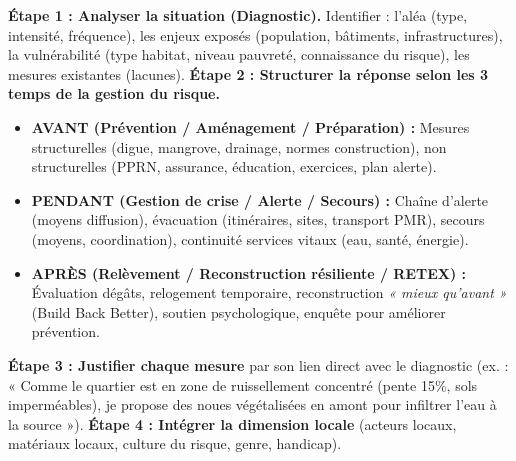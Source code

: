 \documentclass[11pt]{article}
\begin{document}
\begin{methode}
\textbf{Étape 1 : Analyser la situation (Diagnostic).} Identifier : l'aléa (type, intensité, fréquence), les enjeux exposés (population, bâtiments, infrastructures), la vulnérabilité (type habitat, niveau pauvreté, connaissance du risque), les mesures existantes (lacunes).
\textbf{Étape 2 : Structurer la réponse selon les 3 temps de la gestion du risque.}
\begin{itemize}
    \item \textbf{AVANT (Prévention / Aménagement / Préparation) :} Mesures structurelles (digue, mangrove, drainage, normes construction), non structurelles (PPRN, assurance, éducation, exercices, plan alerte).
    \item \textbf{PENDANT (Gestion de crise / Alerte / Secours) :} Chaîne d'alerte (moyens diffusion), évacuation (itinéraires, sites, transport PMR), secours (moyens, coordination), continuité services vitaux (eau, santé, énergie).
    \item \textbf{APRÈS (Relèvement / Reconstruction résiliente / RETEX) :} Évaluation dégâts, relogement temporaire, reconstruction \emph{« mieux qu'avant »} (Build Back Better), soutien psychologique, enquête pour améliorer prévention.
\end{itemize}
\textbf{Étape 3 : Justifier chaque mesure} par son lien direct avec le diagnostic (ex. : « Comme le quartier est en zone de ruissellement concentré (pente 15\%, sols imperméables), je propose des noues végétalisées en amont pour infiltrer l'eau à la source »).
\textbf{Étape 4 : Intégrer la dimension locale} (acteurs locaux, matériaux locaux, culture du risque, genre, handicap).
\end{methode}
\end{document}

